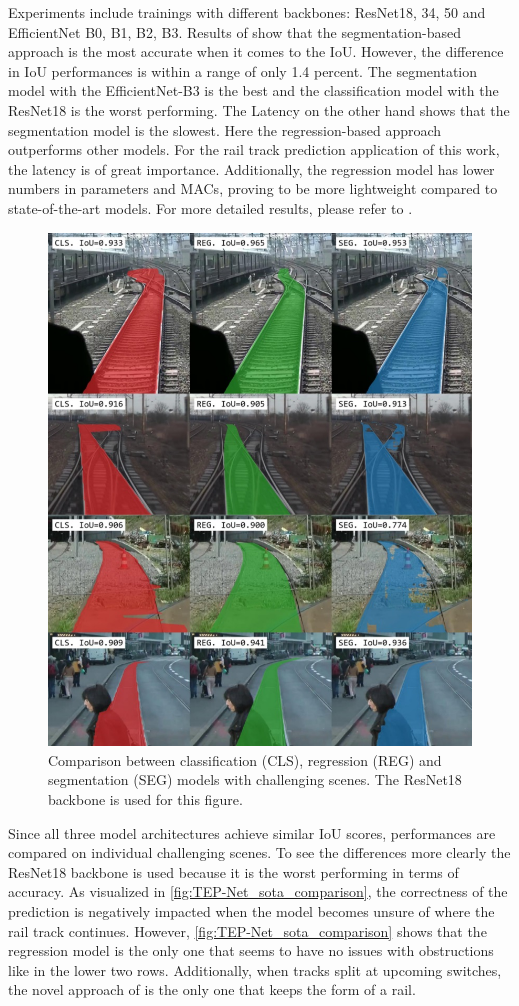 Experiments include trainings with different backbones: ResNet18, 34, 50 and EfficientNet B0, B1, B2, B3.
Results of \cite{tepNet2024} show that the segmentation-based approach is the most accurate when it comes to the \ac{IoU}.
However, the difference in \ac{IoU} performances is within a range of only 1.4 percent.
The segmentation model with the EfficientNet-B3 is the best and the classification model with the ResNet18 is the worst performing.
The Latency on the other hand shows that the segmentation model is the slowest.
Here the regression-based approach outperforms other models.
For the rail track prediction application of this work, the latency is of great importance.
Additionally, the regression model has lower numbers in parameters and \ac{MACs}, proving to be more lightweight compared to state-of-the-art models.
For more detailed results, please refer to \cite{tepNet2024}.

\begin{figure}[H]
    \centering
    \includegraphics[width=0.7\linewidth]{PICs/Baselinepaper/comparison_sota_tep-net.jpg}
    \caption{Comparison between classification (CLS), regression (REG) and segmentation (SEG) models with challenging scenes.
    The ResNet18 backbone is used for this figure.}
    \label{fig:TEP-Net_sota_comparison}
\end{figure}

Since all three model architectures achieve similar \ac{IoU} scores, performances are compared on individual challenging scenes.
To see the differences more clearly the ResNet18 backbone is used because it is the worst performing in terms of accuracy.
As visualized in \autoref{fig:TEP-Net_sota_comparison}, the correctness of the prediction is negatively impacted when the model becomes unsure of where the rail track continues.
However, \autoref{fig:TEP-Net_sota_comparison} shows that the regression model is the only one that seems to have no issues with obstructions like in the lower two rows.
Additionally, when tracks split at upcoming switches, the novel approach of \cite{tepNet2024} is the only one that keeps the form of a rail.

